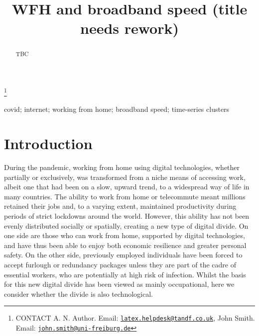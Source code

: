 \documentclass[]{interact}
\theoremstyle{plain}%
\theoremstyle{definition}
\theoremstyle{remark}
\begin{document}

\title{WFH and broadband speed (title needs rework)}


\author{
}

\thanks{CONTACT A. N. Author. Email: \href{mailto:latex.helpdesk@tandf.co.uk}{\nolinkurl{latex.helpdesk@tandf.co.uk}}, John Smith. Email: \href{mailto:john.smith@uni-freiburg.de}{\nolinkurl{john.smith@uni-freiburg.de}}}

\maketitle

\begin{abstract}
TBC
\end{abstract}

\begin{keywords}
covid; internet; working from home; broadband speed; time-series
clusters
\end{keywords}

\hypertarget{sec:1}{%
\section{Introduction}\label{sec:1}}

During the pandemic, working from home using digital technologies,
whether partially or exclusively, was transformed from a niche means of
accessing work, albeit one that had been on a slow, upward trend, to a
widespread way of life in many countries. The ability to work from home
or telecommute meant millions retained their jobs and, to a varying
extent, maintained productivity during periods of strict lockdowns
around the world. However, this ability has not been evenly distributed
socially or spatially, creating a new type of digital divide. On one
side are those who can work from home, supported by digital
technologies, and have thus been able to enjoy both economic resilience
and greater personal safety. On the other side, previously employed
individuals have been forced to accept furlough or redundancy packages
unless they are part of the cadre of essential workers, who are
potentially at high risk of infection. Whilst the basis for this new
digital divide has been viewed as mainly occupational, here we consider
whether the divide is also technological.
\end{document}

